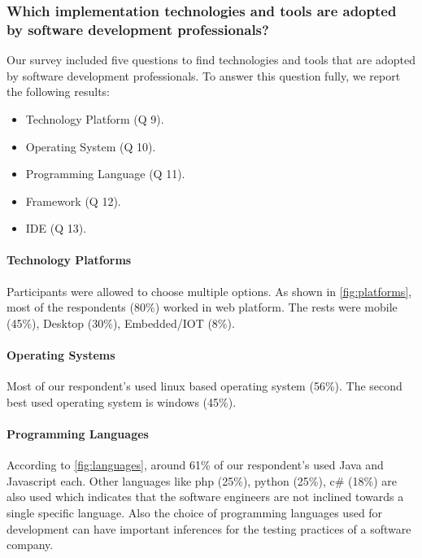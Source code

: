 \subsubsection{Which implementation technologies and tools are adopted by software development professionals?}
\label{tools}

Our survey included five questions to find technologies and tools that are adopted by software development professionals. To answer this question fully, we report the following results:
\begin{itemize}
\item Technology Platform (Q 9).
\item Operating System (Q 10).
\item Programming Language (Q 11).
\item Framework (Q 12).
\item IDE (Q 13).
\end{itemize}

\paragraph{Technology Platforms}
Participants were allowed to choose multiple options. As shown in \ref{fig:platforms}, most of the respondents (80\%) worked in web platform. The rests were mobile (45\%), Desktop (30\%), Embedded/IOT (8\%).

\paragraph{Operating Systems}
Most of our respondent's used linux based operating system (56\%). The second best used operating system is windows (45\%).


\paragraph{Programming Languages}
According to \ref{fig:languages}, around 61\% of our respondent's used Java and Javascript each. Other languages like php (25\%), python (25\%), c\# (18\%) are also used which indicates that the software engineers are not inclined towards a single specific language. Also the choice of programming languages used for development can have important inferences for the testing practices of a software company.

